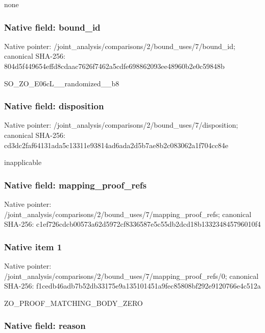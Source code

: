\documentclass[10pt,a4paper]{article}
\begin{document}
none


\subsubsection{Native field: bound\_id}


Native pointer: /joint\_analysis/comparis\allowbreak{}ons/2/bound\_uses/7/bound\allowbreak{}\_id; canonical SHA-256: 804d5f449654effd8cdaac76\allowbreak{}26f7462a5cdfe698862093ee\allowbreak{}48960b2e0c59848b


SO\_ZO\_E06cL\_\_randomized\_\_b8


\subsubsection{Native field: disposition}


Native pointer: /joint\_analysis/comparis\allowbreak{}ons/2/bound\_uses/7/dispo\allowbreak{}sition; canonical SHA-256: cd3dc2faf64131ada5c13311\allowbreak{}e93814ad6ada2d5b7ae8b2c0\allowbreak{}83062a1f704cc84e


inapplicable


\subsubsection{Native field: mapping\_proof\_refs}


Native pointer: /joint\_analysis/comparis\allowbreak{}ons/2/bound\_uses/7/mappi\allowbreak{}ng\_proof\_refs; canonical SHA-256: c1ef726cdcb00573a62d5972\allowbreak{}cf8336587e5c55db2dcd18b1\allowbreak{}33234845796010f4



\subsubsection{Native item 1}


Native pointer: /joint\_analysis/comparis\allowbreak{}ons/2/bound\_uses/7/mappi\allowbreak{}ng\_proof\_refs/0; canonical SHA-256: f1cedb46adb7b52db33175e9\allowbreak{}a135101451a9fec85808bf29\allowbreak{}2e9120766e4c512a


ZO\_PROOF\_MATCHING\_BODY\_ZERO


\subsubsection{Native field: reason}
\end{document}
